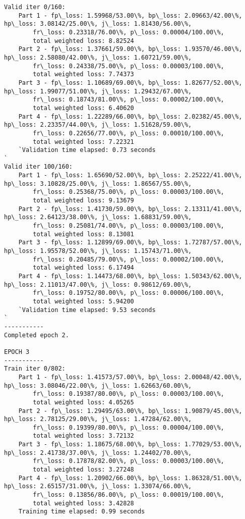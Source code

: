 \documentclass[11pt]{article}
\begin{document}
\begin{Verbatim}[commandchars=\\\{\}]
Valid iter 0/160:
	Part 1 - fp\_loss: 1.59968/53.00\%, bp\_loss: 2.09663/42.00\%, hp\_loss: 3.08142/25.00\%, j\_loss: 1.81430/56.00\%, 
		fr\_loss: 0.23318/76.00\%, p\_loss: 0.00004/100.00\%, 
		total weighted loss: 8.82524
	Part 2 - fp\_loss: 1.37661/59.00\%, bp\_loss: 1.93570/46.00\%, hp\_loss: 2.58080/42.00\%, j\_loss: 1.60721/59.00\%, 
		fr\_loss: 0.24338/75.00\%, p\_loss: 0.00003/100.00\%, 
		total weighted loss: 7.74373
	Part 3 - fp\_loss: 1.10689/69.00\%, bp\_loss: 1.82677/52.00\%, hp\_loss: 1.99077/51.00\%, j\_loss: 1.29432/67.00\%, 
		fr\_loss: 0.18743/81.00\%, p\_loss: 0.00002/100.00\%, 
		total weighted loss: 6.40620
	Part 4 - fp\_loss: 1.22289/66.00\%, bp\_loss: 2.02382/45.00\%, hp\_loss: 2.23357/44.00\%, j\_loss: 1.51628/59.00\%, 
		fr\_loss: 0.22656/77.00\%, p\_loss: 0.00010/100.00\%, 
		total weighted loss: 7.22321
	`Validation time elapsed: 0.73 seconds
`
Valid iter 100/160:
	Part 1 - fp\_loss: 1.65690/52.00\%, bp\_loss: 2.25222/41.00\%, hp\_loss: 3.10828/25.00\%, j\_loss: 1.86567/55.00\%, 
		fr\_loss: 0.25368/75.00\%, p\_loss: 0.00003/100.00\%, 
		total weighted loss: 9.13679
	Part 2 - fp\_loss: 1.41730/59.00\%, bp\_loss: 2.13311/41.00\%, hp\_loss: 2.64123/38.00\%, j\_loss: 1.68831/59.00\%, 
		fr\_loss: 0.25081/74.00\%, p\_loss: 0.00003/100.00\%, 
		total weighted loss: 8.13081
	Part 3 - fp\_loss: 1.12899/69.00\%, bp\_loss: 1.72787/57.00\%, hp\_loss: 1.95578/52.00\%, j\_loss: 1.15743/71.00\%, 
		fr\_loss: 0.20485/79.00\%, p\_loss: 0.00002/100.00\%, 
		total weighted loss: 6.17494
	Part 4 - fp\_loss: 1.14473/68.00\%, bp\_loss: 1.50343/62.00\%, hp\_loss: 2.11013/47.00\%, j\_loss: 0.98612/69.00\%, 
		fr\_loss: 0.19752/80.00\%, p\_loss: 0.00006/100.00\%, 
		total weighted loss: 5.94200
	`Validation time elapsed: 9.53 seconds
`
-----------
Completed epoch 2.

EPOCH 3
-----------
Train iter 0/802:
	Part 1 - fp\_loss: 1.41573/57.00\%, bp\_loss: 2.00048/42.00\%, hp\_loss: 3.08046/22.00\%, j\_loss: 1.62663/60.00\%, 
		fr\_loss: 0.19387/80.00\%, p\_loss: 0.00003/100.00\%, 
		total weighted loss: 4.05265
	Part 2 - fp\_loss: 1.29495/63.00\%, bp\_loss: 1.90879/45.00\%, hp\_loss: 2.78125/29.00\%, j\_loss: 1.47284/62.00\%, 
		fr\_loss: 0.19399/80.00\%, p\_loss: 0.00004/100.00\%, 
		total weighted loss: 3.72132
	Part 3 - fp\_loss: 1.18675/68.00\%, bp\_loss: 1.77029/53.00\%, hp\_loss: 2.41738/37.00\%, j\_loss: 1.24402/70.00\%, 
		fr\_loss: 0.17878/82.00\%, p\_loss: 0.00003/100.00\%, 
		total weighted loss: 3.27248
	Part 4 - fp\_loss: 1.20902/66.00\%, bp\_loss: 1.86328/51.00\%, hp\_loss: 2.65157/31.00\%, j\_loss: 1.33074/66.00\%, 
		fr\_loss: 0.13856/86.00\%, p\_loss: 0.00019/100.00\%, 
		total weighted loss: 3.42828
	Training time elapsed: 0.99 seconds


\end{Verbatim}
\end{document}
